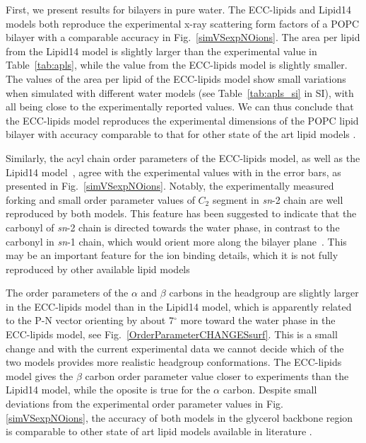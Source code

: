 \documentclass[aip,jcp,twocolumn]{revtex4}
\begin{document}
First, we present results for bilayers in pure water.
The ECC-lipids and Lipid14 models both reproduce the experimental x-ray scattering form factors
of a POPC bilayer with a comparable accuracy in Fig.~\ref{simVSexpNOions}.
The area per lipid from the Lipid14 model is slightly larger than the
experimental value in Table~\ref{tab:apls}, while the value from the ECC-lipids model
is slightly smaller. The values of the area per lipid of the ECC-lipids model show small variations
when simulated with different water models (see Table~\ref{tab:apls_si} in SI),
with all being close to the experimentally reported values.
We can thus conclude that the ECC-lipids model reproduces the experimental dimensions of the POPC
lipid bilayer with accuracy comparable to that for other state of the art lipid models \cite{ollila16}.

Similarly, the acyl chain order parameters of the
ECC-lipids model, as well as the Lipid14 model~\cite{dickson14}, agree 
with the experimental values with in the error bars, as presented
in Fig.~\ref{simVSexpNOions}. Notably, the experimentally measured forking and
small order parameter values of $C_2$ segment in {\it sn}-2 chain are well
reproduced by both models. This feature has been suggested to indicate that the carbonyl
of {\it sn}-2 chain is directed towards the water phase, in contrast to the
carbonyl in {\it sn}-1 chain, which would orient more along the bilayer
plane~\cite{seelig75,schindler75,gawrisch92}. This may be an important
feature for the ion binding details, which it is not fully reproduced by other
available lipid models~\cite{ollila16}

The order parameters of the $\alpha$ and $\beta$ carbons in the headgroup are slightly larger
in the ECC-lipids model than in the Lipid14 model, which is apparently related to the
P-N vector orienting by about 7$^{\circ}$ more toward the water phase in the ECC-lipids model, 
see Fig.~\ref{OrderParameterCHANGESsurf}. This is a small change and with the current experimental data we cannot decide which of the two models provides more realistic
headgroup conformations. The ECC-lipids model gives
the $\beta$ carbon order parameter value closer to experiments than the Lipid14 model, while
the oposite is true for the $\alpha$ carbon.
Despite small deviations from the experimental order parameter values
in Fig. \ref{simVSexpNOions},
the accuracy of both models in the glycerol backbone region
is comparable to other state
of art lipid models available in literature \cite{botan15}.
\end{document}
